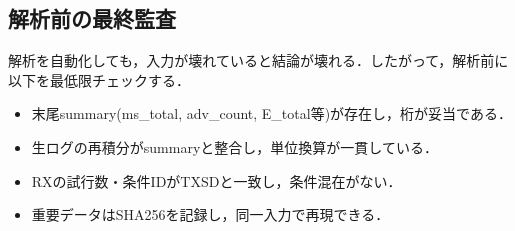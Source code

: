 \subsection{解析前の最終監査}
解析を自動化しても，入力が壊れていると結論が壊れる．したがって，解析前に以下を最低限チェックする．
\begin{itemize}
  \item 末尾summary(ms\_total, adv\_count, E\_total等)が存在し，桁が妥当である．
  \item 生ログの再積分がsummaryと整合し，単位換算が一貫している．
  \item RXの試行数・条件IDがTXSDと一致し，条件混在がない．
  \item 重要データはSHA256を記録し，同一入力で再現できる．
\end{itemize}


